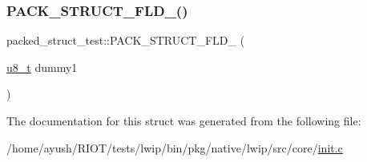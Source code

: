 \mbox{\label{structpacked__struct__test_a3e24dcbac86147707ffe8afb7b2b1198}} 
\subsubsection{\texorpdfstring{P\+A\+C\+K\+\_\+\+S\+T\+R\+U\+C\+T\+\_\+\+F\+L\+D\+\_()}{PACK\_STRUCT\_FLD\_8()}\hspace{0.1cm}{\footnotesize\ttfamily [2/2]}}
{\footnotesize\ttfamily packed\+\_\+struct\+\_\+test\+::\+P\+A\+C\+K\+\_\+\+S\+T\+R\+U\+C\+T\+\_\+\+F\+L\+D\+\_ (\begin{DoxyParamCaption}\item[{\hyperlink{group__compiler__abstraction_ga4caecabca98b43919dd11be1c0d4cd8e}{u8\+\_\+t}}]{dummy1 }\end{DoxyParamCaption})}



The documentation for this struct was generated from the following file\+:\begin{DoxyCompactItemize}
\item 
/home/ayush/\+R\+I\+O\+T/tests/lwip/bin/pkg/native/lwip/src/core/\hyperlink{native_2lwip_2src_2core_2init_8c}{init.\+c}\end{DoxyCompactItemize}
